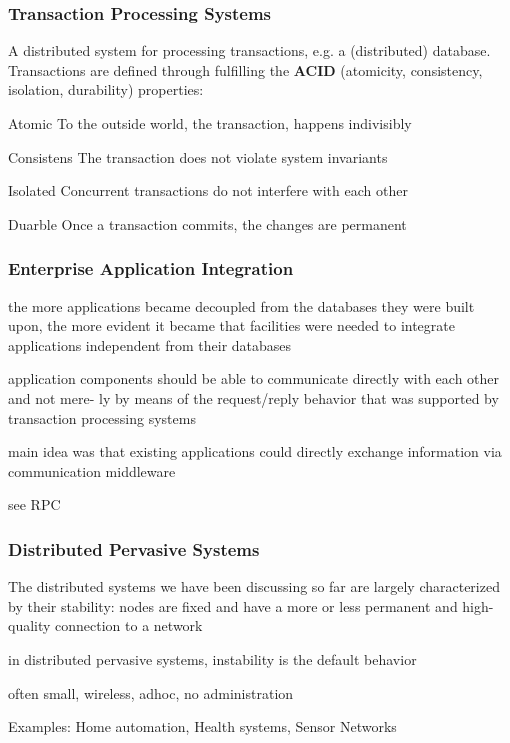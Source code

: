 \documentclass[ngerman,a4paper]{report}
\begin{document}
\subsubsection{Transaction Processing Systems}
A distributed system for processing transactions, e.g. a (distributed) database. 
Transactions are defined through fulfilling the \textbf{ACID} (atomicity, consistency, isolation, durability) properties:
\begin{compactdesc}
\item[Atomic] To the outside world, the transaction, happens indivisibly
\item[Consistens] The transaction does not violate system invariants
\item[Isolated] Concurrent transactions do not interfere with each other
\item[Duarble] Once a transaction commits, the changes are permanent
\end{compactdesc}

\subsubsection{Enterprise Application Integration}

\begin{compactitem}
\item the more applications became decoupled from the databases they were built upon, the more evident it became that facilities were needed to integrate applications independent from their databases
\item application components should be able to communicate directly with each other and not mere- ly by means of the request/reply behavior that was supported by transaction processing systems
\item main idea was that existing applications could directly exchange information via communication middleware
\item see RPC
\end{compactitem}

\subsubsection{Distributed Pervasive Systems}
\begin{compactitem}
\item The distributed systems we have been discussing so far are largely characterized by their stability: nodes are fixed and have a more or less permanent and high-quality connection to a network
\item in distributed pervasive systems, instability is the default behavior
\item often small, wireless, adhoc, no administration
\item Examples: Home automation, Health systems, Sensor Networks
\end{compactitem}
\end{document}
